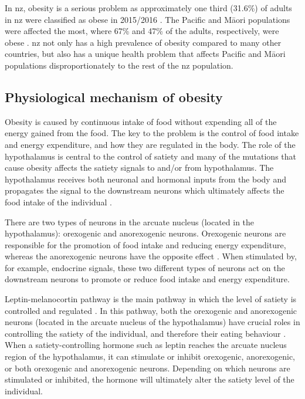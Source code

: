In \gls{nz}, obesity is a serious problem as approximately one third (31.6\%) of adults in \gls{nz} were classified as obese in 2015/2016 \citep{Health2016}.
The Pacific and M\=aori populations were affected the most, where 67\% and 47\% of the adults, respectively, were obese \citep{Health2016}.
\gls{nz} not only has a high prevalence of obesity compared to many other countries, but also has a unique health problem that affects Pacific and M\=aori populations disproportionately to the rest of the \gls{nz} population.

\subsection{Physiological mechanism of obesity}
\label{sub:physiological_mechanism_of_obesity}

Obesity is caused by continuous intake of food without expending all of the energy gained from the food.
The key to the problem is the control of food intake and energy expenditure, and how they are regulated in the body.
The role of the hypothalamus is central to the control of satiety and many of the mutations that cause obesity affects the satiety signals to and/or from hypothalamus.
The hypothalamus receives both neuronal and hormonal inputs from the body and propagates the signal to the downstream neurons which ultimately affects the food intake of the individual \citep{Bell2005, Spiegelman2001}.

There are two types of neurons in the arcuate nucleus (located in the hypothalamus): orexogenic and anorexogenic neurons.
Orexogenic neurons are responsible for the promotion of food intake and reducing energy expenditure, whereas the anorexogenic neurons have the opposite effect \citep{Barsh2002}.
When stimulated by, for example, endocrine signals, these two different types of neurons act on the downstream neurons to promote or reduce food intake and energy expenditure.

Leptin-melanocortin pathway is the main pathway in which the level of satiety is controlled and regulated \citep{Spiegelman2001}.
In this pathway, both the orexogenic and anorexogenic neurons (located in the arcuate nucleus of the hypothalamus) have crucial roles in controlling the satiety of the individual, and therefore their eating behaviour \citep{Barsh2002,Bell2005}.
When a satiety-controlling hormone such as leptin reaches the arcuate nucleus region of the hypothalamus, it can stimulate or inhibit orexogenic, anorexogenic, or both orexogenic and anorexogenic neurons.
Depending on which neurons are stimulated or inhibited, the hormone will ultimately alter the satiety level of the individual.

